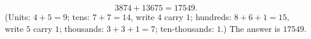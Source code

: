 \[3874+13675=17549.\]
(Units: $4+5=9$; tens: $7+7=14$, write $4$ carry $1$; hundreds: $8+6+1=15$, write $5$ carry $1$; thousands: $3+3+1=7$; ten-thousands: $1$.) The answer is $\boxed{17549}$.
